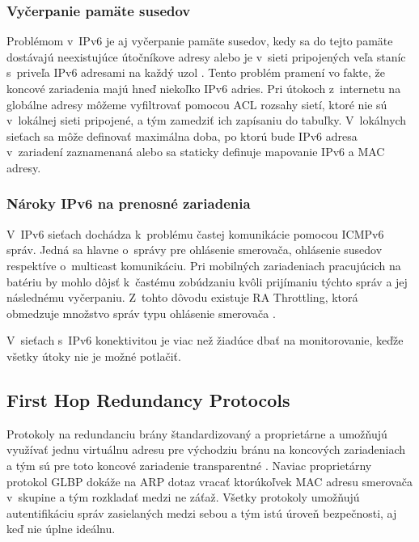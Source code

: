 \subsubsection{Vyčerpanie pamäte susedov}
Problémom v~IPv6 je aj vyčerpanie pamäte susedov, kedy sa do tejto pamäte dostávajú neexistujúce útočníkove adresy alebo je v~sieti pripojených veľa staníc s~priveľa IPv6 adresami na každý uzol \cite{Podermanski1232015}\cite{Podermanski1932015}. Tento problém pramení vo fakte, že koncové zariadenia majú hneď niekoľko IPv6 adries. Pri útokoch z~internetu na globálne adresy môžeme vyfiltrovať pomocou ACL rozsahy sietí, ktoré nie sú v~lokálnej sieti pripojené, a tým zamedziť ich zapísaniu do tabuľky. V~lokálnych sieťach sa môže definovať maximálna doba, po ktorú bude IPv6 adresa v~zariadení zaznamenaná alebo sa staticky definuje mapovanie IPv6 a MAC adresy. 

\subsubsection{Nároky IPv6 na prenosné zariadenia}
V~IPv6 sieťach dochádza k~problému častej komunikácie pomocou ICMPv6 správ. Jedná sa hlavne o~správy pre ohlásenie smerovača, ohlásenie susedov respektíve o~multicast komunikáciu. Pri mobilných zariadeniach pracujúcich na batériu by mohlo dôjsť k~častému zobúdzaniu kvôli prijímaniu týchto správ a jej následnému vyčerpaniu. Z~tohto dôvodu existuje RA Throttling, ktorá obmedzuje množstvo správ typu ohlásenie smerovača \cite{Podermanski532015}.


V~sieťach s~IPv6 konektivitou je viac než žiadúce dbať na monitorovanie, keďže všetky útoky nie je možné potlačiť. 



\subsection{First Hop Redundancy Protocols}
Protokoly na redundanciu brány štandardizovaný  a proprietárne  a  umožňujú využívať jednu virtuálnu adresu pre východziu bránu na koncových zariadeniach a tým sú pre toto koncové zariadenie transparentné \cite{Lammle2013}. Naviac proprietárny protokol GLBP dokáže na ARP dotaz vracať ktorúkoľvek MAC adresu smerovača v~skupine a tým rozkladať medzi ne záťaž. Všetky protokoly umožňujú autentifikáciu správ zasielaných medzi sebou a tým istú úroveň bezpečnosti, aj keď nie úplne ideálnu.  


